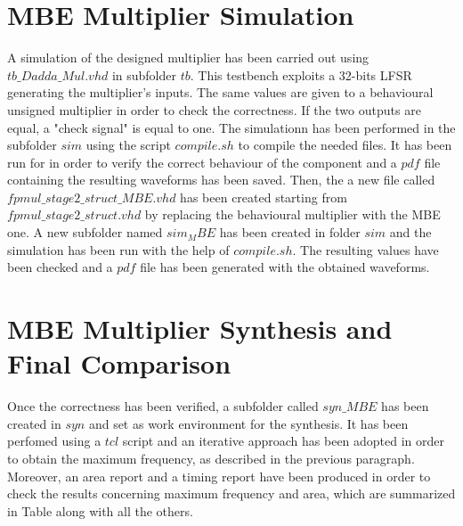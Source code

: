 \section{MBE Multiplier Simulation}

A simulation of the designed multiplier has been carried out using $tb\_Dadda\_Mul.vhd$ in subfolder $tb$. 
This testbench exploits a 32-bits LFSR generating the multiplier's inputs. The same values are given to a behavioural
unsigned multiplier in order to check the correctness. If the two outputs are equal, a "check signal" is equal to one.
The simulationn has been performed in the subfolder $sim$ using the script $compile.sh$ to compile the needed files.
It has been run for in order to verify the correct behaviour of the component and a $pdf$ file containing the resulting
waveforms has been saved.
\newline
\newline
Then, the a new file called $fpmul\_stage2\_struct\_MBE.vhd$ has been created starting from $fpmul\_stage2\_struct.vhd$
by replacing the behavioural multiplier with the MBE one. A new subfolder named $sim_MBE$ has been created in folder $sim$ and
the simulation has been run with the help of $compile.sh$. The resulting values have been checked and a $pdf$ file has been generated
with the obtained waveforms.

\section{MBE Multiplier Synthesis and Final Comparison}

Once the correctness has been verified, a subfolder called $syn\_MBE$ has been created in $syn$ and set as work environment for the
synthesis. It has been perfomed using a $tcl$ script and an iterative approach has been adopted in order to obtain the maximum frequency, as described in the previous paragraph. Moreover, an area report and a timing report have been produced in order to check the results concerning maximum frequency and area, which are summarized in Table along with all the others.



